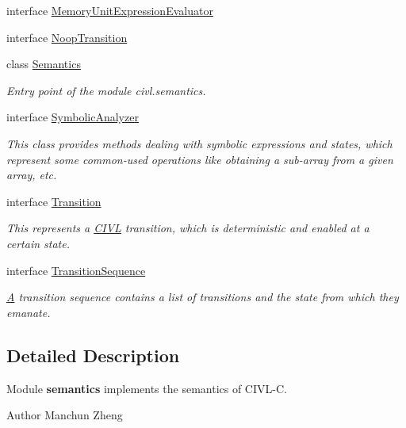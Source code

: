 \begin{DoxyCompactItemize}
interface \hyperlink{interfaceedu_1_1udel_1_1cis_1_1vsl_1_1civl_1_1semantics_1_1IF_1_1MemoryUnitExpressionEvaluator}{Memory\+Unit\+Expression\+Evaluator}
\item 
interface \hyperlink{interfaceedu_1_1udel_1_1cis_1_1vsl_1_1civl_1_1semantics_1_1IF_1_1NoopTransition}{Noop\+Transition}
\item 
class \hyperlink{classedu_1_1udel_1_1cis_1_1vsl_1_1civl_1_1semantics_1_1IF_1_1Semantics}{Semantics}
\begin{DoxyCompactList}\small\item\em Entry point of the module civl.\+semantics. \end{DoxyCompactList}\item 
interface \hyperlink{interfaceedu_1_1udel_1_1cis_1_1vsl_1_1civl_1_1semantics_1_1IF_1_1SymbolicAnalyzer}{Symbolic\+Analyzer}
\begin{DoxyCompactList}\small\item\em This class provides methods dealing with symbolic expressions and states, which represent some common-\/used operations like obtaining a sub-\/array from a given array, etc. \end{DoxyCompactList}\item 
interface \hyperlink{interfaceedu_1_1udel_1_1cis_1_1vsl_1_1civl_1_1semantics_1_1IF_1_1Transition}{Transition}
\begin{DoxyCompactList}\small\item\em This represents a \hyperlink{classedu_1_1udel_1_1cis_1_1vsl_1_1civl_1_1CIVL}{C\+I\+V\+L} transition, which is deterministic and enabled at a certain state. \end{DoxyCompactList}\item 
interface \hyperlink{interfaceedu_1_1udel_1_1cis_1_1vsl_1_1civl_1_1semantics_1_1IF_1_1TransitionSequence}{Transition\+Sequence}
\begin{DoxyCompactList}\small\item\em \hyperlink{structA}{A} transition sequence contains a list of transitions and the state from which they emanate. \end{DoxyCompactList}\end{DoxyCompactItemize}


\subsection{Detailed Description}
Module {\bfseries semantics} implements the semantics of C\+I\+V\+L-\/\+C. 

\begin{DoxyAuthor}{Author}
Manchun Zheng 
\end{DoxyAuthor}
